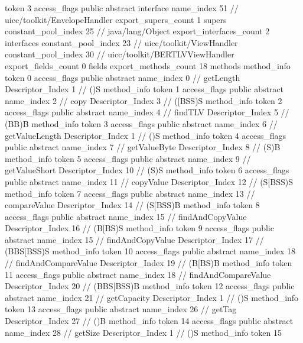 {{{			token	3
			access_flags	public abstract interface
			name_index	51		// uicc/toolkit/EnvelopeHandler
			export_supers_count	1
			supers {
				constant_pool_index	25		// java/lang/Object
			}
			export_interfaces_count	2
			interfaces {
				constant_pool_index	23		// uicc/toolkit/ViewHandler
				constant_pool_index	30		// uicc/toolkit/BERTLVViewHandler
			}
			export_fields_count	0
			fields {
			}
			export_methods_count	18
			methods {
				method_info {
					token	0
					access_flags	public abstract
					name_index	0		// getLength
					Descriptor_Index	1		// ()S
				}
				method_info {
					token	1
					access_flags	public abstract
					name_index	2		// copy
					Descriptor_Index	3		// ([BSS)S
				}
				method_info {
					token	2
					access_flags	public abstract
					name_index	4		// findTLV
					Descriptor_Index	5		// (BB)B
				}
				method_info {
					token	3
					access_flags	public abstract
					name_index	6		// getValueLength
					Descriptor_Index	1		// ()S
				}
				method_info {
					token	4
					access_flags	public abstract
					name_index	7		// getValueByte
					Descriptor_Index	8		// (S)B
				}
				method_info {
					token	5
					access_flags	public abstract
					name_index	9		// getValueShort
					Descriptor_Index	10		// (S)S
				}
				method_info {
					token	6
					access_flags	public abstract
					name_index	11		// copyValue
					Descriptor_Index	12		// (S[BSS)S
				}
				method_info {
					token	7
					access_flags	public abstract
					name_index	13		// compareValue
					Descriptor_Index	14		// (S[BSS)B
				}
				method_info {
					token	8
					access_flags	public abstract
					name_index	15		// findAndCopyValue
					Descriptor_Index	16		// (B[BS)S
				}
				method_info {
					token	9
					access_flags	public abstract
					name_index	15		// findAndCopyValue
					Descriptor_Index	17		// (BBS[BSS)S
				}
				method_info {
					token	10
					access_flags	public abstract
					name_index	18		// findAndCompareValue
					Descriptor_Index	19		// (B[BS)B
				}
				method_info {
					token	11
					access_flags	public abstract
					name_index	18		// findAndCompareValue
					Descriptor_Index	20		// (BBS[BSS)B
				}
				method_info {
					token	12
					access_flags	public abstract
					name_index	21		// getCapacity
					Descriptor_Index	1		// ()S
				}
				method_info {
					token	13
					access_flags	public abstract
					name_index	26		// getTag
					Descriptor_Index	27		// ()B
				}
				method_info {
					token	14
					access_flags	public abstract
					name_index	28		// getSize
					Descriptor_Index	1		// ()S
				}
				method_info {
					token	15
}}}}}
